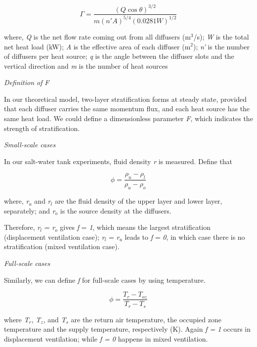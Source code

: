 \begin{equation}
\Gamma  = \frac{{{{(Q\cos \theta )}^{3/2}}}}{{m{{(n'A)}^{5/4}}{{(0.0281W)}^{1/2}}}}
\end{equation}

where, \emph{Q} is the net flow rate coming out from all diffusers (m\(^{3}\)/s); \emph{W} is the total net heat load (kW); \emph{A} is the effective area of each diffuser (m\(^{2}\)); \emph{n'} is the number of diffusers per heat source; \emph{q} is the angle between the diffuser slots and the vertical direction and \emph{m} is the number of heat sources

\emph{Definition of} \emph{F}

In our theoretical model, two-layer stratification forms at steady state, provided that each diffuser carries the same momentum flux, and each heat source has the same heat load. We could define a dimensionless parameter \emph{F}, which indicates the strength of stratification.

\emph{Small-scale cases}

In our salt-water tank experiments, fluid density \emph{r} is measured. Define that

\begin{equation}
\phi  = \frac{{{\rho_u} - {\rho_l}}}{{{\rho_u} - {\rho_o}}}
\end{equation}

where, \emph{r\(_{u}\)} and \emph{r\(_{l}\)} are the fluid density of the upper layer and lower layer, separately; and \emph{r\(_{o}\)} is the source density at the diffusers.

Therefore, \emph{r\(_{l}\)} = \emph{r\(_{o}\)} gives \emph{f} = \emph{1}, which means the largest stratification (displacement ventilation case); \emph{r\(_{l}\)} = \emph{r\(_{u}\)} leads to \emph{f} = \emph{0}, in which case there is no stratification (mixed ventilation case).

\emph{Full-scale cases}

Similarly, we can define \emph{f} for full-scale cases by using temperature.

\begin{equation}
\phi  = \frac{{{T_r} - {T_{oz}}}}{{{T_r} - {T_s}}}
\end{equation}

where \emph{T\(_{r}\)}, \emph{T\(_{z}\)}, and \emph{T\(_{s}\)} are the return air temperature, the occupied zone temperature and the supply temperature, respectively (K). Again \emph{f = 1} occurs in displacement ventilation; while \emph{f = 0} happens in mixed ventilation.

